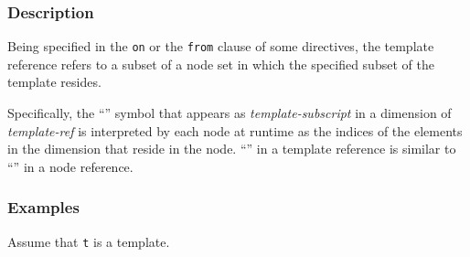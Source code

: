 \subsubsection*{Description}

Being specified in the {\tt on} or the {\tt from} clause of some
directives, the template reference refers to a subset of a node set
in which the specified subset of the template resides.

Specifically, the ``{\tt *}'' symbol that appears as {\it
template-subscript} in a dimension of {\it template-ref} is interpreted
by each node at runtime as the indices of the elements in the dimension
that reside in the node. ``{\tt *}'' in a template reference is
similar to ``{\tt *}'' in a node reference.

%


\subsubsection*{Examples}

Assume that {\tt t} is a template.

